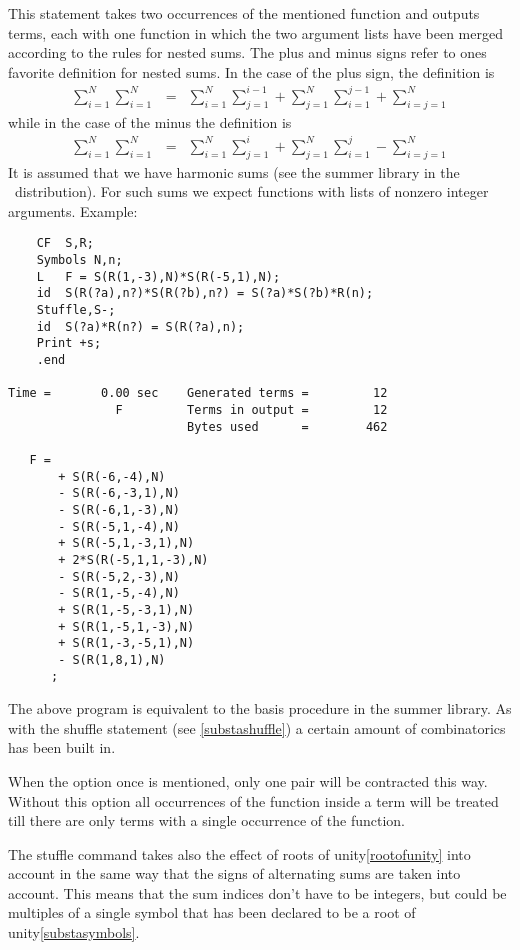 \noindent This statement 
takes two occurrences of the mentioned function and outputs 
terms, each with one function in which the two argument lists have been 
merged according to the rules for nested sums. The plus and minus signs 
refer to ones favorite definition for nested sums. In the case of the plus 
sign, the definition is
\begin{eqnarray}
    \sum_{i=1}^N \sum_{i=1}^N & = & \sum_{i=1}^N \sum_{j=1}^{i-1}
        + \sum_{j=1}^N \sum_{i=1}^{j-1}
        + \sum_{i=j=1}^N
\end{eqnarray}
\setcounter{equation}{4}
while in the case of the minus the definition is
\begin{eqnarray}
    \sum_{i=1}^N \sum_{i=1}^N & = & \sum_{i=1}^N \sum_{j=1}^{i}
        + \sum_{j=1}^N \sum_{i=1}^{j}
        - \sum_{i=j=1}^N
\end{eqnarray}
\setcounter{equation}{5}
It is assumed that we have harmonic sums (see the 
summer library in the \FORM\ distribution). For such sums we expect 
functions with lists of nonzero integer arguments. Example:
\begin{verbatim}
    CF  S,R;
    Symbols N,n;
    L   F = S(R(1,-3),N)*S(R(-5,1),N);
    id  S(R(?a),n?)*S(R(?b),n?) = S(?a)*S(?b)*R(n);
    Stuffle,S-;
    id  S(?a)*R(n?) = S(R(?a),n);
    Print +s;
    .end

Time =       0.00 sec    Generated terms =         12
               F         Terms in output =         12
                         Bytes used      =        462

   F =
       + S(R(-6,-4),N)
       - S(R(-6,-3,1),N)
       - S(R(-6,1,-3),N)
       - S(R(-5,1,-4),N)
       + S(R(-5,1,-3,1),N)
       + 2*S(R(-5,1,1,-3),N)
       - S(R(-5,2,-3),N)
       - S(R(1,-5,-4),N)
       + S(R(1,-5,-3,1),N)
       + S(R(1,-5,1,-3),N)
       + S(R(1,-3,-5,1),N)
       - S(R(1,8,1),N)
      ;
\end{verbatim}
The above program is equivalent to the basis procedure in the summer 
library. As with the shuffle statement (see 
\ref{substashuffle}) a certain amount of combinatorics has been built in.

When the option once is mentioned, only one pair will be contracted this 
way. Without this option all occurrences of the function inside a term will 
be treated till there are only terms with a single occurrence of the 
function.

The stuffle command takes also the effect of roots of 
unity\ref{rootofunity} into account in the same way 
that the signs of alternating sums are taken into account. This means that 
the sum indices don't have to be integers, but could be multiples of a 
single symbol that has been declared to be a root of 
unity\ref{substasymbols}.
\vspace{10mm}
%

